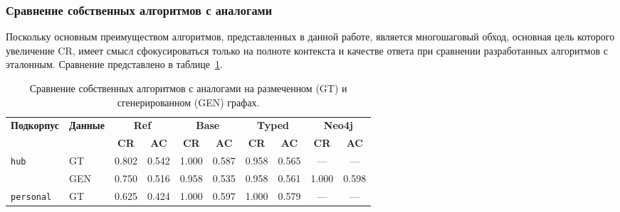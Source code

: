 \subsubsection{Сравнение собственных алгоритмов с аналогами}

Поскольку основным преимуществом алгоритмов, представленных в данной работе,
является многошаговый обход, основная цель которого увеличение CR,
имеет смысл сфокусироваться только на полноте контекста и качестве ответа
при сравнении разработанных алгоритмов с эталонным.
Сравнение представлено в таблице~\ref{tab:complex_graphrag_comparison}.

\begin{table}[H]
    \caption{Сравнение собственных алгоритмов с аналогами на размеченном (GT) и сгенерированном (GEN) графах.}
    \label{tab:complex_graphrag_comparison}
    \centering
    \renewcommand{\arraystretch}{1.1}
    \setlength{\tabcolsep}{4pt}
    \begin{tabular}{l|l|cc|cc|cc|cc}
        \hline
        \multirow{2}{*}{\textbf{Подкорпус}} & \multirow{2}{*}{\textbf{Данные}} & \multicolumn{2}{c|}{\textbf{Ref}} & \multicolumn{2}{c|}{\textbf{Base}} & \multicolumn{2}{c|}{\textbf{Typed}} & \multicolumn{2}{c}{\textbf{Neo4j}}                                                         \\
        \cline{3-10}
                                            &                                  & \textbf{CR}                       & \textbf{AC}                        & \textbf{CR}                         & \textbf{AC}                        & \textbf{CR} & \textbf{AC} & \textbf{CR} & \textbf{AC} \\
        \hline
        \multirow{2}{*}{\texttt{hub}}
                                            & GT                               & 0.802                             & 0.542                              & 1.000                               & 0.587                              & 0.958       & 0.565       & ---         & ---         \\
                                            & GEN                              & 0.750                             & 0.516                              & 0.958                               & 0.535                              & 0.958       & 0.561       & 1.000       & 0.598       \\
        \hline
        \multirow{2}{*}{\texttt{personal}}
                                            & GT                               & 0.625                             & 0.424                              & 1.000                               & 0.597                              & 1.000       & 0.579       & ---         & ---         \\

\end{tabular}
\end{table}
